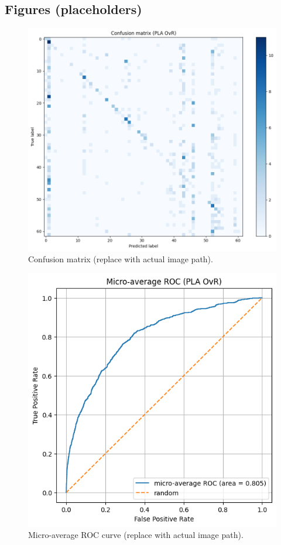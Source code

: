 \documentclass[11pt,a4paper]{article}
\begin{document}
\subsection{Figures (placeholders)}
\begin{figure}[H]
  \centering
  \includegraphics[width=0.7\linewidth]{PLA_images/cn_matrix.png}
  \caption{Confusion matrix (replace with actual image path).}
  \label{fig:confmat}
\end{figure}

\begin{figure}[H]
  \centering
  \includegraphics[width=0.7\linewidth]{PLA_images/roc.png}
  \caption{Micro-average ROC curve (replace with actual image path).}
  \label{fig:roc}
\end{figure}
\end{document}
